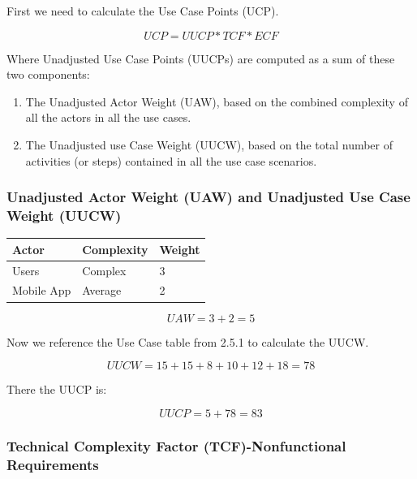 \documentclass[letterpaper,english, 12pt]{scrreprt}
\begin{document}
First we need to calculate the Use Case Points (UCP).

\begin{equation}
UCP = UUCP* TCF *ECF
\end{equation}

Where Unadjusted Use Case Points (UUCPs) are computed as a sum of these two components:

\begin{enumerate}
\item The Unadjusted Actor Weight (UAW), based on the combined complexity of all the actors in all the use cases.
\item The Unadjusted use Case Weight (UUCW), based on the total number of activities (or steps) contained in all the use case scenarios.
\end{enumerate}


\subsubsection{Unadjusted Actor Weight (UAW) and Unadjusted Use Case Weight (UUCW)}
\begin{center}
        \begin{tabular}{|C{3cm}|C{3cm}|C{3cm}|}
                \hline
                        Actor & Complexity & Weight \\
                \hline
                       Users & Complex & 3 \\
                \hline
                       Mobile App & Average & 2 \\
                \hline
        \end{tabular}
\end{center}

\begin{equation}
UAW = 3 + 2 = 5
\end{equation}

Now we reference the Use Case table from 2.5.1 to calculate the UUCW.

\begin{equation}
UUCW = 15 + 15 + 8 + 10 + 12 + 18 = 78
\end{equation}

There the UUCP is:

\begin{equation}
UUCP = 5 + 78 = 83
\end{equation}

\subsubsection{Technical Complexity Factor (TCF)-Nonfunctional Requirements}
\end{document}
